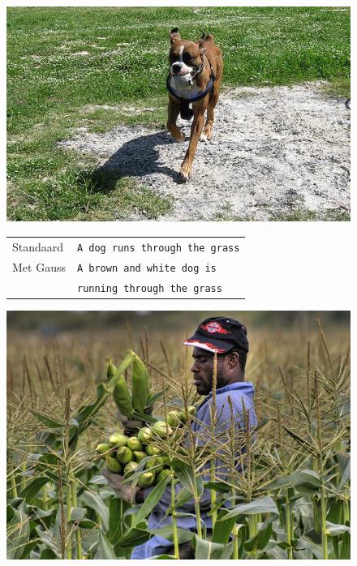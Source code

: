 \begin{figure}
	\centering
	\begin{minipage}[t]{.3\textwidth}
		\centering
		\vspace{0pt}
		\includegraphics[width=\textwidth]{Images/Results/gauss/hond}
	\end{minipage}\hfill	
	\begin{minipage}[t]{.7\textwidth}
		\vspace{0pt}
		\begin{tabular}{ll}
			Standaard & \texttt{A dog runs through the grass} \\
			Met Gauss & \texttt{A brown and white dog is}\\
			~ & \texttt{running through the grass} \\
		\end{tabular}
	\end{minipage}
			\centering
		\begin{minipage}[t]{.3\textwidth}
			\centering
			\vspace{0pt}
			\includegraphics[width=\textwidth]{Images/Results/gauss/man}

\end{minipage}
\end{figure}
